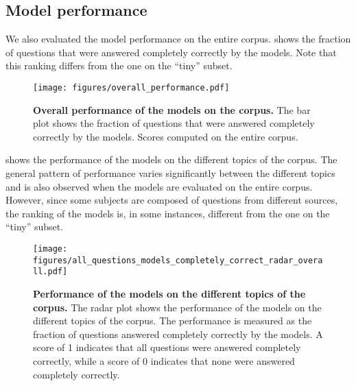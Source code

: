 

\subsection{Model performance}
We also evaluated the model performance on the entire \chembench corpus. 
 shows the fraction of questions that were answered completely correctly by the models. 
Note that this ranking differs from the one on the \enquote{tiny} subset.

\begin{figure}[htb]
    \centering
    \texttt{[image: figures/overall\_performance.pdf]}
    \caption{\textbf{Overall performance of the models on the \chembench corpus.} The bar plot shows the fraction of questions that were answered completely correctly by the models. Scores computed on the entire \chembench corpus.}
    \label{fig:barplot_all_correct_all_questions}
\end{figure}

 shows the performance of the models on the different topics of the \chembench corpus.
The general pattern of performance varies significantly between the different topics and is also observed when the models are evaluated on the entire corpus. 
However, since some subjects are composed of questions from different sources, the ranking of the models is, in some instances, different from the one on the \enquote{tiny} subset.

\begin{figure}[htb]
    \centering
    \texttt{[image: figures/all\_questions\_models\_completely\_correct\_radar\_overall.pdf]}
    \caption{\textbf{Performance of the models on the different topics of the \chembench corpus.} The radar plot shows the performance of the models on the different topics of the \chembench corpus. The performance is measured as the fraction of questions answered completely correctly by the models.
    A score of 1 indicates that all questions were answered completely correctly, while a score of 0 indicates that none were answered completely correctly.
    }
    \label{fig:all_questions_models_completely_correct_radar_overall}
\end{figure}

